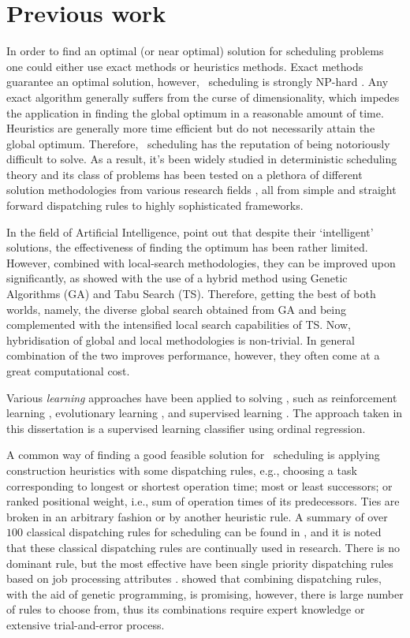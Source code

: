 \section{Previous work}
In order to find an optimal (or near optimal) solution for scheduling problems 
one could either use exact methods or heuristics methods. Exact methods 
guarantee an optimal solution, however, \jsp\ scheduling is strongly NP-hard 
\citep{Garey76:NPhard}. Any exact algorithm generally suffers from the curse of 
dimensionality, which impedes the application in finding the global optimum in 
a reasonable amount of time. Heuristics are generally more time efficient but 
do not necessarily attain the global optimum. Therefore, \jsp\ scheduling 
has the reputation of being notoriously difficult to solve. As a result, it's been widely studied in deterministic scheduling theory and its class of problems has been tested on a plethora of different solution methodologies from various research fields \citep{Meeran12}, all from simple and straight forward dispatching rules to highly sophisticated frameworks.

In the field of Artificial Intelligence, \cite{Meeran12} point out that despite 
their `intelligent' solutions, the effectiveness of finding the optimum has 
been rather limited. However, combined with local-search methodologies, they 
can be improved upon significantly, as \citeauthor{Meeran12} showed with the 
use of a hybrid method using Genetic Algorithms (GA) and Tabu Search (TS). 
Therefore, getting the best of both worlds, namely, the diverse global search 
obtained from GA and being complemented with the intensified local search 
capabilities of TS. 
Now, hybridisation of global and local methodologies is non-trivial. In 
general combination of the two improves performance, however, they often come 
at a great computational cost.  

Various \emph{learning} approaches have been applied to solving \jsp, such as reinforcement learning \citep{Zhang95}, evolutionary learning \citep{Tay08}, and supervised learning \citep{Siggi05,Malik08}. The approach taken in this dissertation is a supervised learning classifier using ordinal regression. 


A common way of finding a good feasible solution for \jsp\ scheduling is applying construction heuristics with some dispatching rules, e.g., choosing a task corresponding to longest or shortest operation time; most or least successors; or ranked positional weight, i.e., sum of operation times of its predecessors. Ties are broken in an arbitrary fashion or by another heuristic rule.
A summary of over $100$ classical dispatching rules for scheduling can be found in \citet{Panwalkar77}, and it is noted that these classical dispatching rules are continually used in research.  
There is no dominant rule, but the most effective have been single priority dispatching rules based on job processing attributes \citep{Haupt89}. \citet{Tay08} showed that combining dispatching rules, with the aid of genetic programming, is promising, however, there is large number of rules to choose from, thus its combinations require expert knowledge or extensive trial-and-error process. 

